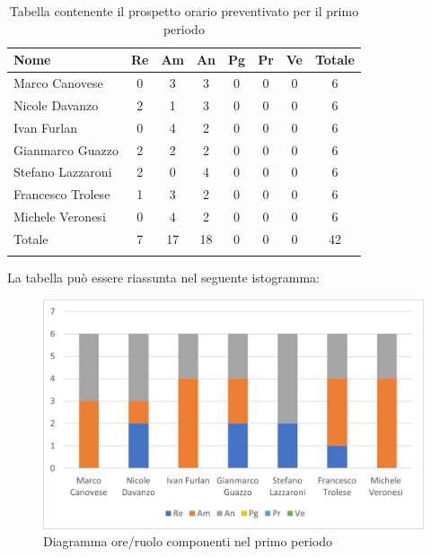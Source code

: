 \begin{longtable}{|l|c|c|c|c|c|c|c|}
	\hline
	\rowcolor{lighter-grayer}
	\textbf{Nome}     & \textbf{Re} & \textbf{Am} & \textbf{An} & \textbf{Pg} & \textbf{Pr} & \textbf{Ve} & \textbf{Totale} \\
	\hline
	\endfirsthead

	\hline
	Marco Canovese    & 0           & 3           & 3           & 0           & 0           & 0           & 6               \\
	\hline
	\hline
	Nicole Davanzo    & 2           & 1           & 3           & 0           & 0           & 0           & 6               \\
	\hline
	\hline
	Ivan Furlan       & 0           & 4           & 2           & 0           & 0           & 0           & 6               \\
	\hline
	\hline
	Gianmarco Guazzo  & 2           & 2           & 2           & 0           & 0           & 0           & 6               \\
	\hline
	\hline
	Stefano Lazzaroni & 2           & 0           & 4           & 0           & 0           & 0           & 6               \\
	\hline
	\hline
	Francesco Trolese & 1           & 3           & 2           & 0           & 0           & 0           & 6               \\
	\hline
	\hline
	Michele Veronesi  & 0           & 4           & 2           & 0           & 0           & 0           & 6               \\
	\hline
	\hline
	Totale            & 7           & 17          & 18          & 0           & 0           & 0           & 42              \\
	\hline
	\rowcolor{white}
	\caption{Tabella contenente il prospetto orario preventivato per il primo periodo}
\end{longtable}


La tabella può essere riassunta nel seguente istogramma:

\begin{figure}[H]
	\centering
	\includegraphics[width=0.8\linewidth]{res/images/preventivo/dettaglio_analisi/1-1.png}
	\caption{Diagramma ore/ruolo componenti nel primo periodo}
	\label{fig:diagramma suddivisione ruoli primo periodo analisi}
\end{figure}

